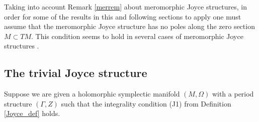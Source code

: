 \documentclass{article}
\theoremstyle{definition}
\numberwithin{equation}{section}
\begin{document}
Taking into account Remark \ref{merrem} about meromorphic Joyce structures, in order for some of the results in this and following sections to apply one must assume that the meromorphic Joyce structure has no poles along the zero section $M\subset TM$. This condition seems to hold in several cases of meromorphic Joyce structures \cite{BridgeFab,BridgelandOsc}.

\subsection{The trivial Joyce structure}\label{trivJoyceSec}

Suppose we are given a holomorphic symplectic manifold $(M,\Omega)$ with a period structure $(\Gamma,Z)$ such that the integrality condition (J1) from Definition \ref{Joyce_def} holds.  
\end{document}
